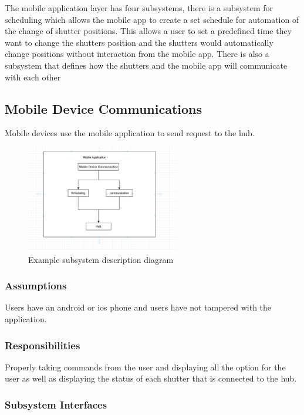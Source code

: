 The mobile application layer has four subsystems, there is a subsystem for scheduling which allows the mobile app to create a set schedule for automation of the change of shutter positions. This allows a user to set a predefined time they want to change the shutters position and the shutters would automatically change positions without interaction from the mobile app. There is also a subsystem that defines how the shutters and the mobile app will communicate with each other

\subsection{Mobile Device Communications}
Mobile devices use the mobile application to send request to the hub.

\begin{figure}[h!]
	\centering
 	\includegraphics[width=0.60\textwidth]{images/Mobile}
 \caption{Example subsystem description diagram}
\end{figure}

\subsubsection{Assumptions}
Users have an android or ios phone and users have not tampered with the application. 

\subsubsection{Responsibilities}
Properly taking commands from the user and displaying all the option for the user as well as displaying the status of each shutter that is connected to the hub.

\subsubsection{Subsystem Interfaces}

